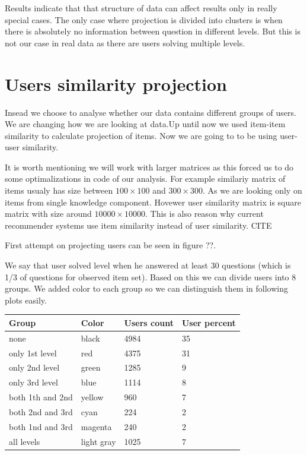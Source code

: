 \documentclass[
  digital, %
  table,   %
  nolof,     %
  nolot,     %
  nocover
]{fithesis3}
\begin{document}
Results indicate that that structure of data can affect results only in really special cases. The only case where projection is divided into clusters is when there is absolutely no information between question in different levels. But this is not our case in real data as there are users solving multiple levels.


\section{Users similarity
projection}\label{users-similarity-projection}

Insead we choose to analyse whether our data contains different groups
of users. We are changing how we are looking at data.Up until now we
used item-item similarity to calculate projection of items. Now we are
going to to be using user-user similarity.

It is worth mentioning we will work with larger matrices as this forced
us to do some optimalizations in code of our analysis. For example
similariy matrix of items usualy has size between $100\times 100$ and
$300\times 300$. As we are looking only on items from single knowledge
component. Hovewer user similarity matrix is square matrix with size
around $10 000\times 10 000$. This is also reason why current
recommender systems use item similarity instead of user similarity. CITE

First attempt on projecting users can be seen in figure ??.


We say that user solved level when he answered at least 30 questions
(which is 1/3 of questions for observed item set). Based on this we can
divide users into 8 groups. We added color to each group so we can
distinguish them in following plots easily.

\begin{center}
  \begin{tabular}{ | l | l | l | l | }
  \hline
  	Group & Color & Users count & User percent \\ \hline
  	none & black & 4984 & 35 \\ \hline
  	only 1st level & red & 4375 & 31 \\ \hline
  	only 2nd level & green & 1285 & 9 \\ \hline
  	only 3rd level & blue & 1114 & 8 \\ \hline
  	both 1th and 2nd & yellow & 960 & 7 \\ \hline
  	both 2nd and 3rd & cyan & 224 & 2 \\ \hline
  	both 1nd and 3rd & magenta & 240 & 2 \\ \hline
  	all levels & light gray & 1025 & 7 \\ \hline
  \end{tabular}
\end{center}
\end{document}
